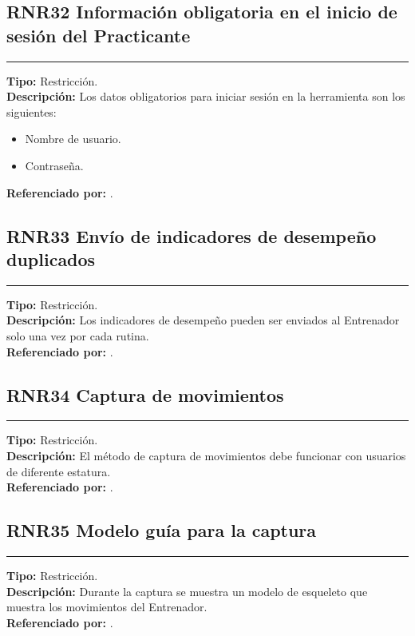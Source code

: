 \subsection{\normalsize{\textcolor[rgb]{0, 0, 0.545098}{RNR32 Información obligatoria en el inicio de sesión del Practicante}}}
\label{rn:RNR32}
\rule[3mm]{16.59cm}{0.1mm} \vspace{1mm}
\textbf{Tipo:} Restricción.\\
\textbf{Descripción:} Los datos obligatorios para iniciar sesión en la herramienta son los siguientes:
\begin{itemize} \itemsep1pt \parskip0pt 
	\item Nombre de usuario.
	\item Contraseña.
\end{itemize}
\textbf{Referenciado por: }  .\\

\subsection{\normalsize{\textcolor[rgb]{0, 0, 0.545098}{RNR33 Envío de indicadores de desempeño duplicados}}}
\label{rn:RNR33}
\rule[3mm]{16.59cm}{0.1mm} \vspace{1mm}
\textbf{Tipo:} Restricción.\\
\textbf{Descripción:} Los indicadores de desempeño pueden ser enviados al Entrenador solo una vez por cada rutina.\\
\textbf{Referenciado por: }  .\\

\subsection{\normalsize{\textcolor[rgb]{0, 0, 0.545098}{RNR34 Captura de movimientos}}}
\label{rn:RNR34}
\rule[3mm]{16.59cm}{0.1mm} \vspace{1mm}
\textbf{Tipo:} Restricción.\\
\textbf{Descripción:} El método de captura de movimientos debe funcionar con usuarios de diferente estatura.\\
\textbf{Referenciado por: }  .\\

\subsection{\normalsize{\textcolor[rgb]{0, 0, 0.545098}{RNR35 Modelo guía para la captura}}}
\label{rn:RNR35}
\rule[3mm]{16.59cm}{0.1mm} \vspace{1mm}
\textbf{Tipo:} Restricción.\\
\textbf{Descripción:} Durante la captura se muestra un modelo de esqueleto que muestra los movimientos del Entrenador.\\
\textbf{Referenciado por: }  .\\


